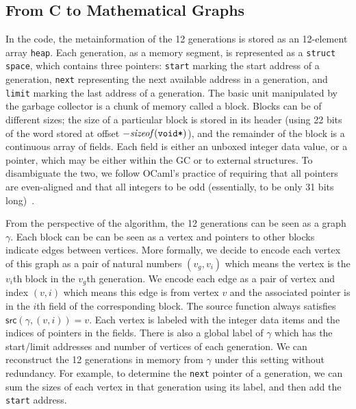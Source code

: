 \subsection{From C to Mathematical Graphs}
\label{sec:movetomathgraph}
In the code, the metainformation of the 12 generations is stored as an
12-element array \texttt{heap}. Each generation, as a memory segment,
is represented as a \texttt{struct} \texttt{space}, which contains
three pointers: \texttt{start} marking the start address of a
generation, \texttt{next} representing the next available address in a
generation, and \texttt{limit} marking the last address of a
generation. The basic unit manipulated by the garbage collector is a
chunk of memory called a block. Blocks can be of different sizes;
the size of a particular block is stored in its
header (using 22 bits of the word stored at offset $-\mathit{sizeof}(\texttt{void*})$), and the remainder of the block is a continuous array of fields. 
Each field is either an unboxed integer data value, or a pointer, which may be
either within the GC or to external structures.  To disambiguate the two,
we follow OCaml's practice of requiring that all pointers are even-aligned and 
that all integers to be odd (essentially, to be only 31 bits long)~\cite{realworldocaml}.

From the perspective of the algorithm, the 12 generations can be seen
as a graph $\gamma$. Each block can be can be seen as a
vertex and pointers to other blocks indicate edges between 
vertices. More formally, we decide to encode each vertex of this graph
as a pair of natural numbers $(v_g, v_i)$ which means the vertex is
the $v_i$th block in the $v_g$th generation. We encode each edge
as a pair of vertex and index $(v, i)$ which means this edge is from
vertex $v$ and the associated pointer is in the $i$th field of the
corresponding block.  The source function always satisfies
$\mathsf{src}(\gamma, (v, i)) = v$.
Each vertex is labeled with the integer data items and the indices of pointers in the
fields. There is also a global label of $\gamma$ which has the
start/limit addresses and number of vertices of each generation. We
can reconstruct the 12 generations in memory from $\gamma$ under this
setting without redundancy. For example, to determine the \texttt{next} pointer of
a generation, we can sum the sizes of each vertex in that generation using its label,
and then add the \texttt{start} address.

